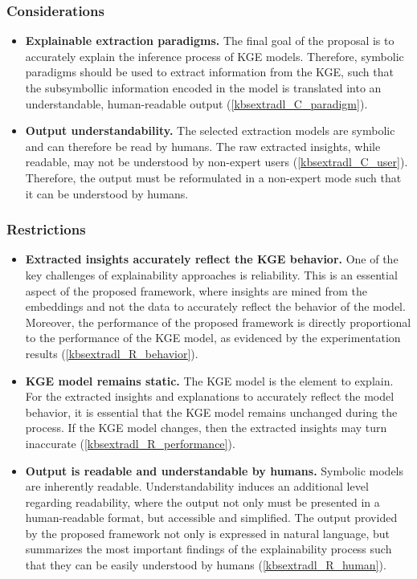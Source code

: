\subsubsection*{Considerations}
\begin{itemize}
    \item \textbf{Explainable extraction paradigms.} The final goal of the proposal is to accurately explain the inference process of KGE models. Therefore, symbolic paradigms should be used to extract information from the KGE, such that the subsymbollic information encoded in the model is translated into an understandable, human-readable output (\ref{kbsextradl_C_paradigm}). 
    
    \item \textbf{Output understandability.} The selected extraction models are symbolic and can therefore be read by humans. The raw extracted insights, while readable, may not be understood by non-expert users (\ref{kbsextradl_C_user}). Therefore, the output must be reformulated in a non-expert mode such that it can be understood by humans.
\end{itemize}

\subsubsection*{Restrictions}
\begin{itemize}
    \item \textbf{Extracted insights accurately reflect the KGE behavior.} One of the key challenges of explainability approaches is reliability. This is an essential aspect of the proposed framework, where insights are mined from the embeddings and not the data to accurately reflect the behavior of the model. Moreover, the performance of the proposed framework is directly proportional to the performance of the KGE model, as evidenced by the experimentation results (\ref{kbsextradl_R_behavior}). 
    
    \item \textbf{KGE model remains static.} The KGE model is the element to explain. For the extracted insights and explanations to accurately reflect the model behavior, it is essential that the KGE model remains unchanged during the process. If the KGE model changes, then the extracted insights may turn inaccurate (\ref{kbsextradl_R_performance}). 
    
    \item \textbf{Output is readable and understandable by humans.} Symbolic models are inherently readable. Understandability induces an additional level regarding readability, where the output not only must be presented in a human-readable format, but accessible and simplified. The output provided by the proposed framework not only is expressed in natural language, but summarizes the most important findings of the explainability process such that they can be easily understood by humans (\ref{kbsextradl_R_human}). 
\end{itemize}


